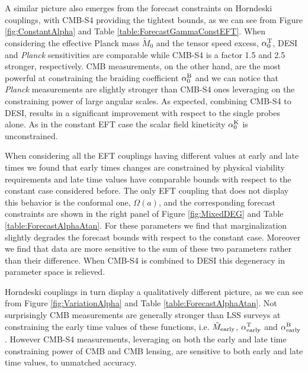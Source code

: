 A similar picture also emerges from the forecast constraints on Horndeski couplings, with CMB-S4 providing the tightest bounds, as we can see from Figure \ref{fig:ConstantAlpha} and Table \ref{table:ForecastGammaConstEFT}. 
When considering the effective Planck mass $\tilde{M}_0$ and the tensor speed excess, $\alpha_0^{\rm T}$, DESI and {\it Planck} sensitivities are comparable while CMB-S4 is a factor 1.5 and 2.5 stronger, respectively. 
CMB measurements, on the other hand, are the most powerful at constraining the braiding coefficient $\alpha_0^{\rm B}$ and we can notice that {\it Planck} measurements are slightly stronger than CMB-S4 ones leveraging on the constraining power of large angular scales. 
As expected, combining CMB-S4 to DESI, results in a significant improvement with respect to the single probes alone.
As in the constant EFT case the scalar field kineticity $\alpha_0^{\rm K}$ is unconstrained.

When considering all the EFT couplings having different values at early and late times we found that early times changes are constrained by physical viability requirements and late time values have comparable bounds with respect to the constant case considered before.
The only EFT coupling that does not display this behavior is the conformal one, $\Omega(a)$, and the corresponding forecast constraints are shown in the right panel of Figure \ref{fig:MixedDEG} and Table \ref{table:ForecastAlphaAtan}. For these parameters we find that marginalization slightly degrades the forecast bounds with respect to the constant case. Moreover we find that data are more sensitive to the sum of these two parameters rather than their difference. When CMB-S4 is combined to DESI this degeneracy in parameter space is relieved.

Horndeski couplings in turn display a qualitatively different picture, as we can see from Figure \ref{fig:VariationAlpha} and Table \ref{table:ForecastAlphaAtan}.
Not surprisingly CMB measurements are generally stronger than LSS surveys at constraining the early time values of these functions, i.e. $\tilde{M}_{\rm early}$, $\alpha^{\rm T}_{\rm early}$ and $\alpha^{\rm B}_{\rm early}$. However CMB-S4 measurements, leveraging on both the early and late time constraining power of CMB and CMB lensing, are sensitive to both early and late time values, to unmatched accuracy.



